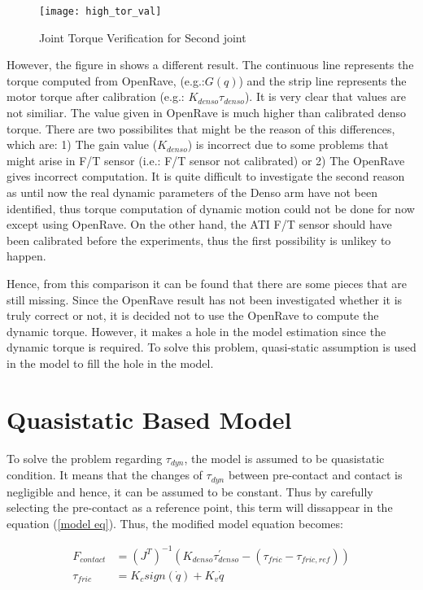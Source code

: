 \begin{figure}[H]
    \centering
    \texttt{[image: high\_tor\_val]}
    \caption{Joint Torque Verification for Second joint}
    \label{fig: tor verification}
\end{figure}

However, the figure in  shows a different result. The continuous line represents the torque computed from OpenRave, (e.g.:$G\left(q \right)$) and the strip line represents the motor torque after calibration (e.g.: $K_{denso} \tau_{denso}$). It is very clear that values are not similiar. The value given in OpenRave is much higher than calibrated denso torque. There are two possibilites that might be the reason of this differences, which are: 1) The gain value ($ K_{denso} $) is incorrect due to some problems that might arise in F/T sensor (i.e.: F/T sensor not calibrated) or 2) The OpenRave gives incorrect computation. It is quite difficult to investigate the second reason as until now the real dynamic parameters of the Denso arm have not been identified, thus torque computation of dynamic motion could not be done for now except using OpenRave. On the other hand, the ATI F/T sensor should have been calibrated before the experiments, thus the first possibility is unlikey to happen. 

Hence, from this comparison it can be found that there are some pieces that are still missing. Since the OpenRave result has not been investigated whether it is truly correct or not, it is decided not to use the OpenRave to compute the dynamic torque. However, it makes a hole in the model estimation since the dynamic torque is required. To solve this problem, quasi-static assumption is used in the model to fill the hole in the model. 

\section{Quasistatic Based Model}

To solve the problem regarding $\tau_{dyn}$, the model is assumed to be quasistatic condition. It means that the changes of $\tau_{dyn}$ between pre-contact and contact is negligible and hence, it can be assumed to be constant. Thus by carefully selecting the pre-contact as a reference point, this term will dissappear in the equation (\ref{model eq}). Thus, the modified model equation becomes:

\begin{align}
\label{quasistatic}
  F_{contact} &= \left(J^{T}\right)^{-1} \left( K_{denso} \tau_{denso}^{\prime} -  \left(\tau_{fric} - \tau_{fric , ref}\right)\right)\\
  \tau_{fric} &= K_{c} sign\left(\dot{q}\right) + K_{v} \dot{q} 
\end{align}

